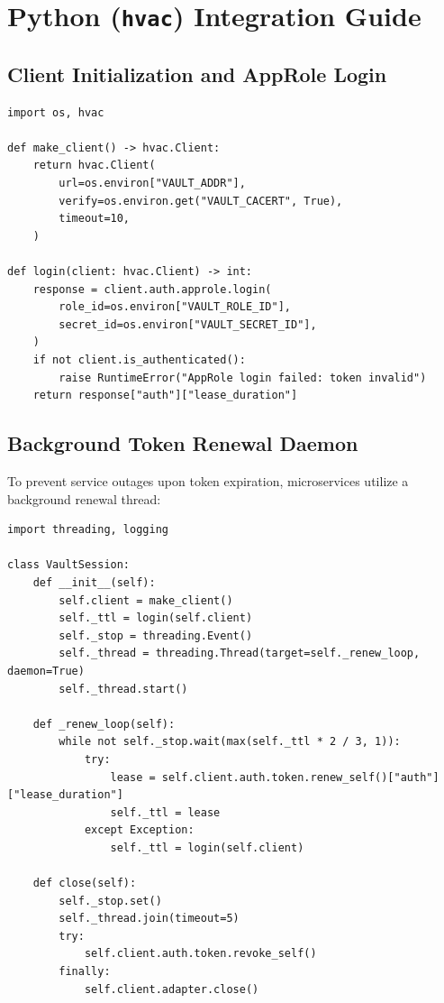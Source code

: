 \documentclass[11pt,a4paper]{article}
\begin{document}
\section{Python (\texttt{hvac}) Integration Guide}

\subsection{Client Initialization and AppRole Login}
\begin{lstlisting}
import os, hvac

def make_client() -> hvac.Client:
    return hvac.Client(
        url=os.environ["VAULT_ADDR"],
        verify=os.environ.get("VAULT_CACERT", True),
        timeout=10,
    )

def login(client: hvac.Client) -> int:
    response = client.auth.approle.login(
        role_id=os.environ["VAULT_ROLE_ID"],
        secret_id=os.environ["VAULT_SECRET_ID"],
    )
    if not client.is_authenticated():
        raise RuntimeError("AppRole login failed: token invalid")
    return response["auth"]["lease_duration"]
\end{lstlisting}

\subsection{Background Token Renewal Daemon}
To prevent service outages upon token expiration, microservices utilize a background renewal thread:
\begin{lstlisting}
import threading, logging

class VaultSession:
    def __init__(self):
        self.client = make_client()
        self._ttl = login(self.client)
        self._stop = threading.Event()
        self._thread = threading.Thread(target=self._renew_loop, daemon=True)
        self._thread.start()

    def _renew_loop(self):
        while not self._stop.wait(max(self._ttl * 2 / 3, 1)):
            try:
                lease = self.client.auth.token.renew_self()["auth"]["lease_duration"]
                self._ttl = lease
            except Exception:
                self._ttl = login(self.client)

    def close(self):
        self._stop.set()
        self._thread.join(timeout=5)
        try:
            self.client.auth.token.revoke_self()
        finally:
            self.client.adapter.close()
\end{lstlisting}
\end{document}
